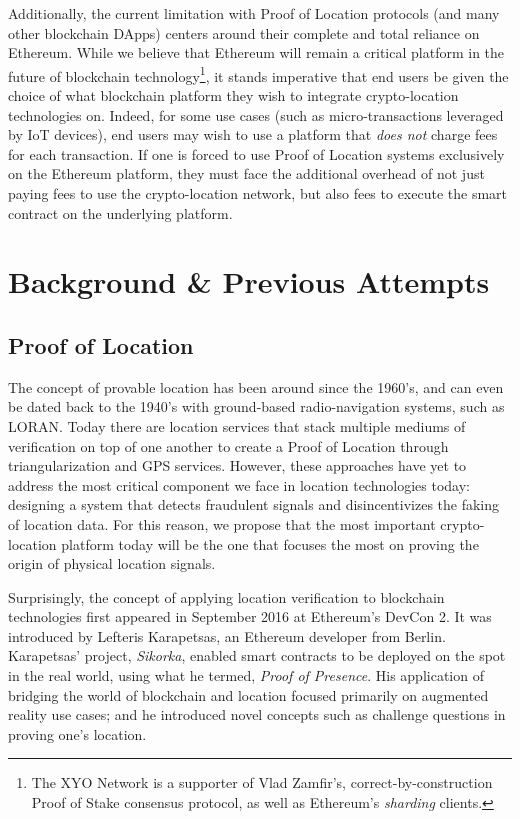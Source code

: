 \documentclass{article}
\begin{document}
Additionally, the current limitation with Proof of Location protocols (and many other blockchain DApps) centers around their complete and total reliance on Ethereum. While we believe that Ethereum will remain a critical platform in the future of blockchain technology\footnote{The XYO Network is a supporter of Vlad Zamfir's, correct-by-construction Proof of Stake consensus protocol, as well as Ethereum's \textit{sharding} clients.}, it stands imperative that end users be given the choice of what blockchain platform they wish to integrate crypto-location technologies on. Indeed, for some use cases (such as micro-transactions leveraged by IoT devices), end users may wish to use a platform that \textit{does not} charge fees for each transaction. If one is forced to use Proof of Location systems exclusively on the Ethereum platform, they must face the additional overhead of not just paying fees to use the crypto-location network, but also fees to execute the smart contract on the underlying platform.

\section{Background \& Previous Attempts}

\subsection{Proof of Location}

The concept of provable location has been around since the 1960's, and can even be dated back to the 1940's with ground-based radio-navigation systems, such as LORAN. Today there are location services that stack multiple mediums of verification on top of one another to create a Proof of Location through triangularization and GPS services. However, these approaches have yet to address the most critical component we face in location technologies today: designing a system that detects fraudulent signals and disincentivizes the faking of location data. For this reason, we propose that the most important crypto-location platform today will be the one that focuses the most on proving the origin of physical location signals.

Surprisingly, the concept of applying location verification to blockchain technologies first appeared in September 2016 at Ethereum's DevCon 2. It was introduced by Lefteris Karapetsas, an Ethereum developer from Berlin. Karapetsas' project, \textit{Sikorka}, enabled smart contracts to be deployed on the spot in the real world, using what he termed, \textit{Proof of Presence}. His application of bridging the world of blockchain and location focused primarily on augmented reality use cases; and he introduced novel concepts such as challenge questions in proving one's location.
\end{document}

